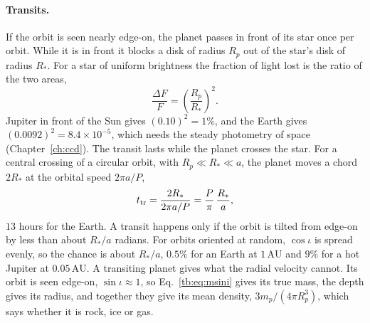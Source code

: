 \paragraph{Transits.} If the orbit is seen nearly edge-on, the planet passes in front of its star once per orbit. While it is in front it blocks a disk of radius $R_p$ out of the star's disk of radius $R_*$. For a star of uniform brightness the fraction of light lost is the ratio of the two areas,
\begin{equation}
	\boxed{\frac{\Delta F}{F}=\left(\frac{R_p}{R_*}\right)^2 .}
	\label{tb:eq:transit_depth}
\end{equation}
Jupiter in front of the Sun gives $(0.10)^2=1\%$, and the Earth gives $(0.0092)^2=8.4\times10^{-5}$, which needs the steady photometry of space (Chapter~\ref{ch:ccd}). The transit lasts while the planet crosses the star. For a central crossing of a circular orbit, with $R_p\ll R_*\ll a$, the planet moves a chord $2R_*$ at the orbital speed $2\pi a/P$,
\[
t_{\rm tr}=\frac{2R_*}{2\pi a/P}=\frac{P}{\pi}\,\frac{R_*}{a},
\]
$13$ hours for the Earth. A transit happens only if the orbit is tilted from edge-on by less than about $R_*/a$ radians. For orbits oriented at random, $\cos\iota$ is spread evenly, so the chance is about $R_*/a$, $0.5\%$ for an Earth at $1\,\mathrm{AU}$ and $9\%$ for a hot Jupiter at $0.05\,\mathrm{AU}$. A transiting planet gives what the radial velocity cannot. Its orbit is seen edge-on, $\sin\iota\approx1$, so Eq.~\eqref{tb:eq:msini} gives its true mass, the depth gives its radius, and together they give its mean density, $3m_p/(4\pi R_p^3)$, which says whether it is rock, ice or gas.

